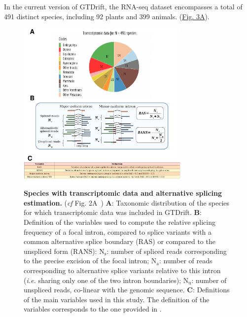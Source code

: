 In the current version of GTDrift, the \acrshort{RNA}-seq dataset encompasses a total of 491 distinct species, including 92 plants and 399 animals. (\hyperref[fig:gtdrift3]{Fig. 3A}).

\begin{figure}[t]   
         \centering
        \includegraphics[width=0.75\textwidth]{Figure3.pdf}
                                                                           
    \caption[Species with transcriptomic data and alternative splicing estimation]{\textbf{Species with transcriptomic data and alternative splicing estimation.} (\textit{cf} Fig. 2A~\citet{benitiere_random_2024}) \textbf{A}: Taxonomic distribution of the species for which transcriptomic data was included in GTDrift. \textbf{B}: Definition of the variables used to compute the relative splicing frequency of a focal intron, compared to splice variants with a common alternative splice boundary (RAS) or compared to the unspliced form  (RANS): $\mathrm{N_s}$: number of spliced reads corresponding to the precise excision of the focal intron; $\mathrm{N_a}$: number of reads corresponding to alternative splice variants relative to this intron (\textit{i.e.} sharing only one of the two intron boundaries); $\mathrm{N_u}$: number of unspliced reads, co-linear with the genomic sequence. \textbf{C}: Definitions of the main variables used in this study. The definition of the variables corresponds to the one provided in \citet{benitiere_random_2024}.\newline}
    \label{fig:gtdrift3}
\end{figure}

